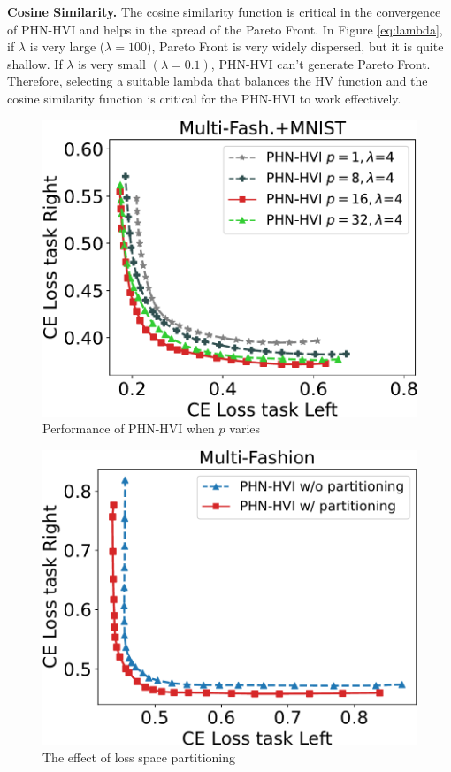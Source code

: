 \documentclass[letterpaper]{article} %
\newcommand{\ourmodel}{PHN-HVI }
\begin{document}
\textbf{Cosine Similarity.} The cosine similarity function is critical in the convergence of \ourmodel and helps in the spread of the Pareto Front. In Figure \ref{eq:lambda}, if $\lambda$ is very large ($\lambda=100$), Pareto Front is very widely dispersed, but it is quite shallow. If $\lambda$ is very small $(\lambda = 0.1)$, \ourmodel can't generate Pareto Front. Therefore, selecting a suitable lambda that balances the HV function and the cosine similarity function is critical for the \ourmodel to work effectively. 
\begin{figure}[!htb]
  \centering
  \includegraphics[width=0.75\columnwidth]{figures/Compare_Head_2.pdf}
  \caption{Performance of \ourmodel when $p$ varies}
  \label{fig:head}
\end{figure}
\begin{figure}[!htb]
  \centering
  \includegraphics[width=0.75\columnwidth]{figures/Partition.pdf}
  \caption{The effect of loss space partitioning}
  \label{fig:adap_correct}
\end{figure}
\end{document}
